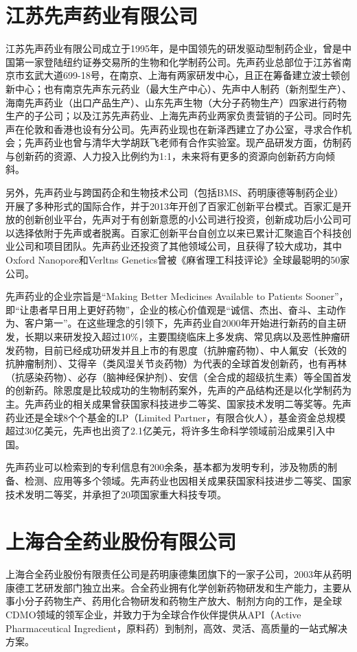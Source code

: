 \documentclass[twocolumn]{ctexbook}
\begin{document}
		\section{江苏先声药业有限公司}
		
		江苏先声药业有限公司成立于1995年，是中国领先的研发驱动型制药企业，曾是中国第一家登陆纽约证券交易所的生物和化学制药公司。先声药业总部位于江苏省南京市玄武大道699-18号，在南京、上海有两家研发中心，且正在筹备建立波士顿创新中心；也有南京先声东元药业（最大生产中心）、先声中人制药（新剂型生产）、海南先声药业（出口产品生产）、山东先声生物（大分子药物生产）四家进行药物生产的子公司；以及江苏先声药业、上海先声药业两家负责营销的子公司。同时先声在伦敦和香港也设有分公司。先声药业现也在新泽西建立了办公室，寻求合作机会；先声药业也曾与清华大学胡跃飞老师有合作实验室。现产品研发方面，仿制药与创新药的资源、人力投入比例约为1:1，未来将有更多的资源向创新药方向倾斜\citep{RN34}。
		
		另外，先声药业与跨国药企和生物技术公司（包括BMS、药明康德等制药企业）开展了多种形式的国际合作，并于2013年开创了百家汇创新平台模式。百家汇是开放的创新创业平台，先声对于有创新意愿的小公司进行投资，创新成功后小公司可以选择依附于先声或者脱离。百家汇创新平台自创立以来已累计汇聚逾百个科技创业公司和项目团队。先声药业还投资了其他领域公司，且获得了较大成功，其中Oxford Nanopore和Verltns Genetics曾被《麻省理工科技评论》全球最聪明的50家公司。
		
		先声药业的企业宗旨是“Making Better Medicines Available to Patients Sooner”，即“让患者早日用上更好药物”，企业的核心价值观是“诚信、杰出、奋斗、主动作为、客户第一”。在这些理念的引领下，先声药业自2000年开始进行新药的自主研发，长期以来研发投入超过10\%，主要围绕临床上多发病、常见病以及恶性肿瘤研发药物，目前已经成功研发并且上市的有恩度（抗肿瘤药物）、中人氟安（长效的抗肿瘤制剂）、艾得辛（类风湿关节炎药物）为代表的全球首发创新药，也有再林（抗感染药物）、必存（脑神经保护剂）、安信（全合成的超级抗生素）等全国首发的创新药。除恩度是比较成功的生物制药案外，先声的产品结构还是以化学制药为主\citep{RN35}。先声药业的相关成果曾获国家科技进步二等奖、国家技术发明二等奖等。先声药业还是全球8个个基金的LP（Limited Partner，有限合伙人），基金资金总规模超过30亿美元，先声也出资了2.1亿美元，将许多生命科学领域前沿成果引入中国。
		
		
		先声药业可以检索到的专利信息有200余条，基本都为发明专利，涉及物质的制备、检测、应用等多个领域。先声药业也因相关成果获国家科技进步二等奖、国家技术发明二等奖，并承担了20项国家重大科技专项。
	
		\section{上海合全药业股份有限公司}
	上海合全药业股份有限责任公司是药明康德集团旗下的一家子公司，2003年从药明康德工艺研发部门独立出来。合全药业拥有化学创新药物研发和生产能力，主要从事小分子药物生产、药用化合物研发和药物生产放大、制剂方向的工作，是全球CDMO领域的领军企业，并致力于为全球合作伙伴提供从API（Active Pharmaceutical Ingredient，原料药）到制剂，高效、灵活、高质量的一站式解决方案。
	
\end{document}
